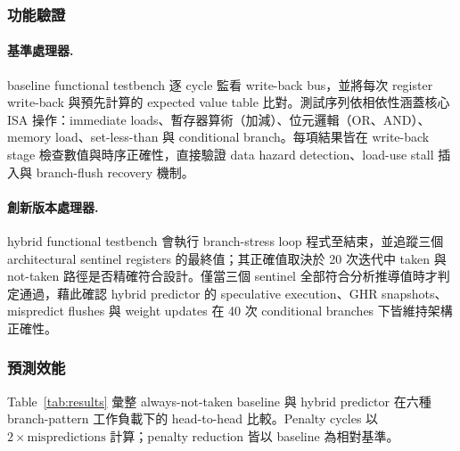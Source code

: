 \documentclass[12pt,a4paper]{article}
\begin{document}
	\subsubsection{功能驗證}

	\paragraph{基準處理器.}
	baseline functional testbench 逐 cycle 監看 write-back bus，並將每次 register write-back 與預先計算的 expected value table 比對。測試序列依相依性涵蓋核心 ISA 操作：immediate loads、暫存器算術（加減）、位元邏輯（OR、AND）、memory load、set-less-than 與 conditional branch。每項結果皆在 write-back stage 檢查數值與時序正確性，直接驗證 data hazard detection、load-use stall 插入與 branch-flush recovery 機制。

	\paragraph{創新版本處理器.}
	hybrid functional testbench 會執行 branch-stress loop 程式至結束，並追蹤三個 architectural sentinel registers 的最終值；其正確值取決於 20 次迭代中 taken 與 not-taken 路徑是否精確符合設計。僅當三個 sentinel 全部符合分析推導值時才判定通過，藉此確認 hybrid predictor 的 speculative execution、GHR snapshots、mispredict flushes 與 weight updates 在 40 次 conditional branches 下皆維持架構正確性。

	\subsubsection{預測效能}

	Table~\ref{tab:results} 彙整 always-not-taken baseline 與 hybrid predictor 在六種 branch-pattern 工作負載下的 head-to-head 比較。Penalty cycles 以 $2\times\text{mispredictions}$ 計算；penalty reduction 皆以 baseline 為相對基準。
\end{document}
